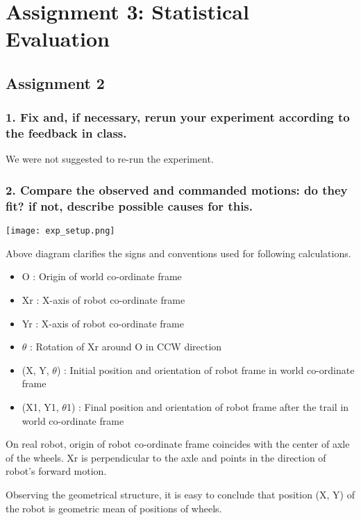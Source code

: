 \section*{Assignment 3: Statistical Evaluation}
\subsection*{Assignment 2}
\subsubsection*{1. Fix and, if necessary, rerun your experiment according to the feedback in class.}
We were not suggested to re-run the experiment.

\subsubsection*{2. Compare the observed and commanded motions: do they fit? if not, describe possible causes for this.} 

\texttt{[image: exp\_setup.png]}

Above diagram clarifies the signs and conventions used for following calculations. 
\begin{itemize}
	\item O : Origin of world co-ordinate frame
	\item Xr : X-axis of robot co-ordinate frame 
	\item Yr : X-axis of robot co-ordinate frame
	\item $\theta$ : Rotation of Xr around O in CCW direction
	\item (X, Y, $\theta$) :  Initial position and orientation of robot frame in world co-ordinate frame
	\item (X1, Y1, $\theta$1) : Final position and orientation of robot frame after the trail in world co-ordinate frame
\end{itemize}

\par On real robot, origin of robot co-ordinate frame coincides with the center of axle of the wheels. Xr is perpendicular to the axle and points in the direction of robot's forward motion. \newline
\par Observing the geometrical structure, it is easy to conclude that position (X, Y) of the robot is geometric mean of positions of wheels. 

